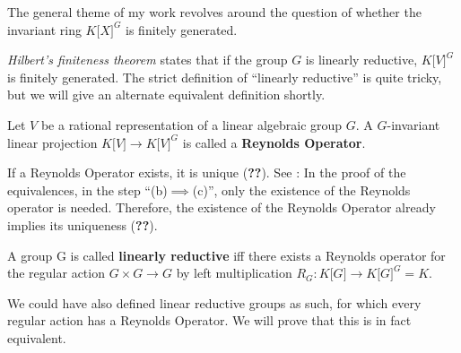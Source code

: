 The general theme of my work revolves around the question of whether the invariant ring $ K\lbrack X\rbrack^G $ is finitely generated.

\textit{Hilbert's finiteness theorem} states that if the group $G$ is linearly reductive, $ K\lbrack V\rbrack^G $ is finitely generated.
The strict definition of ``linearly reductive'' is quite tricky, but we will give an alternate equivalent definition shortly.

\begin{definition}
  Let $ V $ be a rational representation of a linear algebraic group $ G $.
  A $ G $-invariant linear projection $ K\lbrack V\rbrack \longrightarrow K\lbrack V\rbrack^G $ is called a \textbf{Reynolds Operator}.
\end{definition}

\begin{remark}
  If a Reynolds Operator exists, it is unique (\textbf{??}).
  See \cite[p.39f]{DK15}: In the proof of the equivalences, in the step ``(b)$\implies$(c)'', only the existence of the Reynolds operator is needed.
  Therefore, the existence of the Reynolds Operator already implies its uniqueness (\textbf{??}).
\end{remark}

\begin{definition}
  A group G is called \textbf{linearly reductive} iff there exists a Reynolds operator for the regular action $ G \times G \longrightarrow G $ by left multiplication $ R_G \colon K\lbrack G \rbrack \longrightarrow K\lbrack G \rbrack^G = K $.
\end{definition}

\begin{remark}
  We could have also defined linear reductive groups as such, for which every regular action has a Reynolds Operator.
  We will prove that this is in fact equivalent.
\end{remark}


